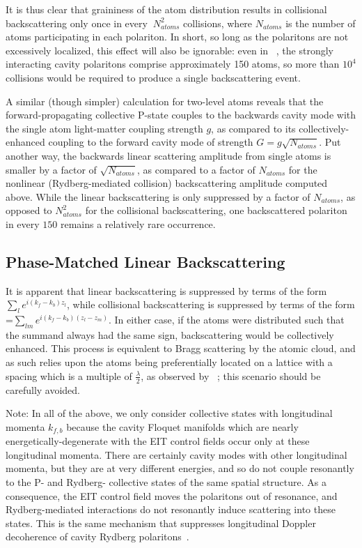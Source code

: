 \documentclass[aps,pra,twocolumn,groupedaddress,10pt,showpacs]{revtex4-1}
\begin{document}
It is thus clear that graininess of the atom distribution results in collisional backscattering only once in every $~N_{atoms}^2$ collisions, where $N_{atoms}$ is the number of atoms participating in each polariton. In short, so long as the polaritons are not excessively localized, this effect will also be ignorable: even in ~\cite{jia2017strongly}, the strongly interacting cavity polaritons comprise approximately 150 atoms, so more than $10^4$ collisions would be required to produce a single backscattering event.

A similar (though simpler) calculation for two-level atoms reveals that the forward-propagating collective P-state couples to the backwards cavity mode with the single atom light-matter coupling strength $g$, as compared to its collectively-enhanced coupling to the forward cavity mode of strength $G=g\sqrt{N_{atoms}}$. Put another way, the backwards linear scattering amplitude from single atoms is smaller by a factor of $\sqrt{N_{atoms}}$, as compared to a factor of $N_{atoms}$ for the nonlinear (Rydberg-mediated collision) backscattering amplitude computed above. While the linear backscattering is only suppressed by a factor of $N_{atoms}$, as opposed to $N_{atoms}^2$ for the collisional backscattering, one backscattered polariton in every $150$ remains a relatively rare occurrence.

\subsection{Phase-Matched Linear Backscattering}
It is apparent that linear backscattering is suppressed by terms of the form $\sum_l e^{i (k_f-k_b) z_l}$, while collisional backscattering is suppressed by terms of the form  =$\sum_{lm} e^{i (k_f-k_b) (z_l-z_m)}$. In either case, if the atoms were distributed such that the summand always had the same sign, backscattering would be collectively enhanced. This process is equivalent to Bragg scattering by the atomic cloud, and as such relies upon the atoms being preferentially located on a lattice with a spacing which is a multiple of $\frac{\lambda}{2}$, as observed by ~\cite{klinner2006normal}; this scenario should be carefully avoided.

Note: In all of the above, we only consider collective states with longitudinal momenta $k_{f,b}$ because the cavity Floquet manifolds which are nearly energetically-degenerate with the EIT control fields occur only at these longitudinal momenta. There are certainly cavity modes with other longitudinal momenta, but they are at very different energies, and so do not couple resonantly to the P- and Rydberg- collective states of the same spatial structure. As a consequence, the EIT control field moves the polaritons out of resonance, and Rydberg-mediated interactions do not resonantly induce scattering into these states. This is the same mechanism that suppresses longitudinal Doppler decoherence of cavity Rydberg polaritons~\cite{Jia2016CavityRydPol}.
\end{document}
